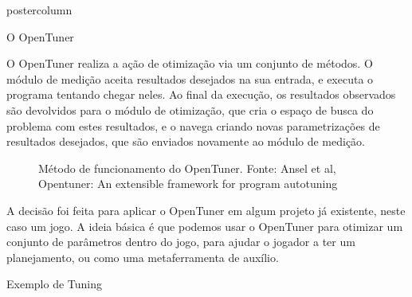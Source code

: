 \documentclass[final]{beamer}
\begin{document}
\begin{frame}
\begin{columns}
\begin{column}{.5\textwidth}
\begin{beamercolorbox}[center,wd=\textwidth]{postercolumn}
\begin{minipage}[T]{.95\textwidth}
{\begin{block}{O OpenTuner}
                \vspace*{0.2cm}
                
                O OpenTuner realiza a ação de otimização via um conjunto de métodos. O módulo de medição aceita resultados desejados na sua entrada, e executa o programa tentando chegar neles. Ao final da execução, os resultados observados são devolvidos para o módulo de otimização, que cria o espaço de busca do problema com estes resultados, e o navega criando novas parametrizações de resultados desejados, que são enviados novamente ao módulo de medição.
                
                \vspace*{0.4cm} 
                
                
                \begin{figure}[h]
                  \caption{Método de funcionamento do OpenTuner.
                    Fonte: Ansel et al, Opentuner: An extensible framework for program autotuning}
                \end{figure}
                
                \vspace*{0.2cm} 
                
                A decisão foi feita para aplicar o OpenTuner em algum projeto já existente, neste caso um jogo. A ideia básica é que podemos usar o OpenTuner para otimizar um conjunto de parâmetros dentro do jogo, para ajudar o jogador a ter um planejamento, ou como uma metaferramenta de auxílio.
                               
                \vspace*{0.2cm} 
            \end{block}
                        
            \vspace*{0.2cm}
            
            \begin{block}{Exemplo de Tuning}
            	\center 
            	

\end{block}}
\end{minipage}
\end{beamercolorbox}
\end{column}
\end{columns}
\end{frame}
\end{document}
